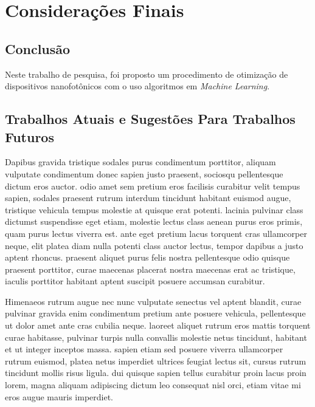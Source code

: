 \chapter{Considerações Finais}

\section{Conclusão}

Neste trabalho de pesquisa, foi proposto um procedimento de otimização de dispositivos nanofotônicos com o uso algoritmos em \textit{Machine Learning}.



\section{Trabalhos Atuais e Sugestões Para Trabalhos Futuros}

Dapibus gravida tristique sodales purus condimentum porttitor, aliquam vulputate condimentum donec sapien justo praesent, sociosqu pellentesque dictum eros auctor. odio amet sem pretium eros facilisis curabitur velit tempus sapien, sodales praesent rutrum interdum tincidunt habitant euismod augue, tristique vehicula tempus molestie at quisque erat potenti. lacinia pulvinar class dictumst suspendisse eget etiam, molestie lectus class aenean purus eros primis, quam purus lectus viverra est. ante eget pretium lacus torquent cras ullamcorper neque, elit platea diam nulla potenti class auctor lectus, tempor dapibus a justo aptent rhoncus. praesent aliquet purus felis nostra pellentesque odio quisque praesent porttitor, curae maecenas placerat nostra maecenas erat ac tristique, iaculis porttitor habitant aptent suscipit posuere accumsan curabitur. 

Himenaeos rutrum augue nec nunc vulputate senectus vel aptent blandit, curae pulvinar gravida enim condimentum pretium ante posuere vehicula, pellentesque ut dolor amet ante cras cubilia neque. laoreet aliquet rutrum eros mattis torquent curae habitasse, pulvinar turpis nulla convallis molestie netus tincidunt, habitant et ut integer inceptos massa. sapien etiam sed posuere viverra ullamcorper rutrum euismod, platea netus imperdiet ultrices feugiat lectus sit, cursus rutrum tincidunt mollis risus ligula. dui quisque sapien tellus curabitur proin lacus proin lorem, magna aliquam adipiscing dictum leo consequat nisl orci, etiam vitae mi eros augue mauris imperdiet.